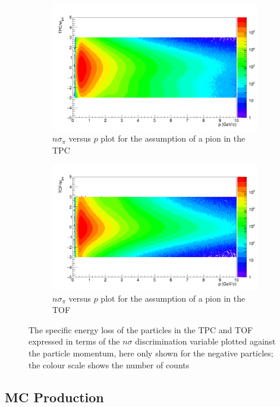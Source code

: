 \begin{figure}[t]
\begin{subfigure}[b]{0.5\linewidth}
\centering
\includegraphics[width=0.98\linewidth]{Figures/ChargedPioCuts/TPCnsigmapioneg.png}
\caption{$n\sigma_{\pi}$ versus $p$ plot for the assumption of a pion in the TPC}
\label{fig:ChpioTPC}
\end{subfigure} \hspace{0.1cm}
\begin{subfigure}[b]{.5\linewidth}
\centering
\includegraphics[width=0.98\linewidth]{Figures/ChargedPioCuts/TOFnsigmapioneg.png}
\caption{$n\sigma_{\pi}$ versus $p$ plot for the assumption of a pion in the TOF}
\label{fig:ChpioTOF}
\end{subfigure}
\caption{The specific energy loss of the particles in the TPC and TOF expressed in terms of the $n\sigma$ discrimination variable plotted against the particle momentum, here only shown for the negative particles; the colour scale shows the number of counts}
\label{fig:PIDChPio}
\end{figure}


\subsection{MC Production}
